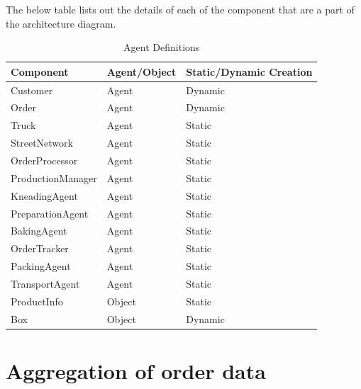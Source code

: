 \documentclass[11pt, a4paper]{article}
\begin{document}
The below table  lists out the details of each of the component that are a part of the architecture diagram.
\begin{table}[h!]
\centering
\begin{tabular}{|l|l|l|}
\hline
\textbf{Component} & \textbf{Agent/Object} & \textbf{Static/Dynamic Creation} \\ \hline
Customer           & Agent                 & Dynamic                          \\ \hline
Order              & Agent                 & Dynamic                          \\ \hline
Truck              & Agent                 & Static                           \\ \hline
StreetNetwork      & Agent                 & Static                           \\ \hline
OrderProcessor     & Agent                 & Static                           \\ \hline
ProductionManager  & Agent                 & Static                           \\ \hline
KneadingAgent      & Agent                 & Static                           \\ \hline
PreparationAgent   & Agent                 & Static                           \\ \hline
BakingAgent        & Agent                 & Static                           \\ \hline
OrderTracker       & Agent                 & Static                           \\ \hline
PackingAgent       & Agent                 & Static                           \\ \hline
TransportAgent     & Agent                 & Static                           \\ \hline
ProductInfo        & Object                & Static                                 \\ \hline
Box                & Object                & Dynamic                          \\ \hline
\end{tabular}
\label{Agent Definition}
\caption{Agent Definitions}
\end{table}

\section{Aggregation of order data}
\end{document}
